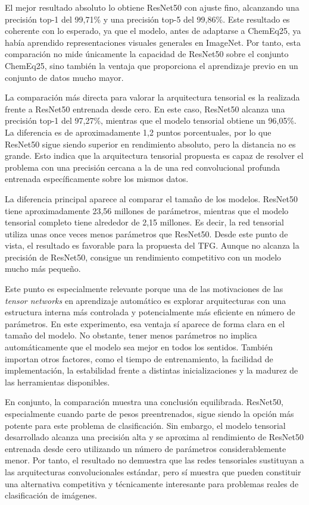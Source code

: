 El mejor resultado absoluto lo obtiene ResNet50 con ajuste fino, alcanzando una precisión top-1 del 99,71\% y una precisión top-5 del 99,86\%. Este resultado es coherente con lo esperado, ya que el modelo, antes de adaptarse a ChemEq25, ya había aprendido representaciones visuales generales en ImageNet. Por tanto, esta comparación no mide únicamente la capacidad de ResNet50 sobre el conjunto ChemEq25, sino también la ventaja que proporciona el aprendizaje previo en un conjunto de datos mucho mayor.

La comparación más directa para valorar la arquitectura tensorial es la realizada frente a ResNet50 entrenada desde cero. En este caso, ResNet50 alcanza una precisión top-1 del 97,27\%, mientras que el modelo tensorial obtiene un 96,05\%. La diferencia es de aproximadamente 1,2 puntos porcentuales, por lo que ResNet50 sigue siendo superior en rendimiento absoluto, pero la distancia no es grande. Esto indica que la arquitectura tensorial propuesta es capaz de resolver el problema con una precisión cercana a la de una red convolucional profunda entrenada específicamente sobre los mismos datos.

La diferencia principal aparece al comparar el tamaño de los modelos. ResNet50 tiene aproximadamente 23,56 millones de parámetros, mientras que el modelo tensorial completo tiene alrededor de 2,15 millones. Es decir, la red tensorial utiliza unas once veces menos parámetros que ResNet50. Desde este punto de vista, el resultado es favorable para la propuesta del TFG. Aunque no alcanza la precisión de ResNet50, consigue un rendimiento competitivo con un modelo mucho más pequeño.

Este punto es especialmente relevante porque una de las motivaciones de las \textit{tensor networks} en aprendizaje automático es explorar arquitecturas con una estructura interna más controlada y potencialmente más eficiente en número de parámetros. En este experimento, esa ventaja sí aparece de forma clara en el tamaño del modelo. No obstante, tener menos parámetros no implica automáticamente que el modelo sea mejor en todos los sentidos. También importan otros factores, como el tiempo de entrenamiento, la facilidad de implementación, la estabilidad frente a distintas inicializaciones y la madurez de las herramientas disponibles.

En conjunto, la comparación muestra una conclusión equilibrada. ResNet50, especialmente cuando parte de pesos preentrenados, sigue siendo la opción más potente para este problema de clasificación. Sin embargo, el modelo tensorial desarrollado alcanza una precisión alta y se aproxima al rendimiento de ResNet50 entrenada desde cero utilizando un número de parámetros considerablemente menor. Por tanto, el resultado no demuestra que las redes tensoriales sustituyan a las arquitecturas convolucionales estándar, pero sí muestra que pueden constituir una alternativa competitiva y técnicamente interesante para problemas reales de clasificación de imágenes.

